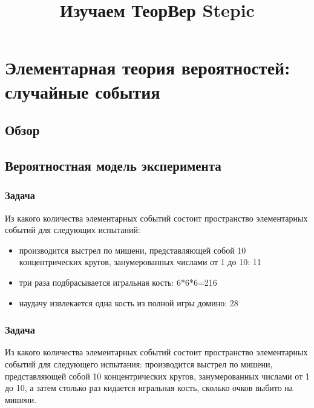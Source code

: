 \documentclass[a4paper,12pt]{article}
\title{Изучаем ТеорВер Stepic}
\begin{document}

\maketitle

\section{Элементарная теория вероятностей: случайные события}

\subsection{Обзор}

\subsection{Вероятностная модель эксперимента}
\subsubsection*{Задача}
Из какого количества элементарных событий состоит пространство элементарных событий для следующих испытаний:
\begin{itemize}
	\item 
	    производится выстрел по мишени, представляющей собой 10 концентрических кругов, занумерованных числами от 1 до 10: 11
	\item 
	    три раза подбрасывается игральная кость: 6*6*6=216
	\item 
	    наудачу извлекается одна кость из полной игры домино: 28
\end{itemize}

\subsubsection*{Задача}
Из какого количества элементарных событий состоит пространство элементарных событий для следующего испытания: производится выстрел по мишени, представляющей собой 10 концентрических кругов, занумерованных числами от 1 до 10, а затем столько раз кидается игральная кость, сколько очков выбито на мишени.
\end{document}
